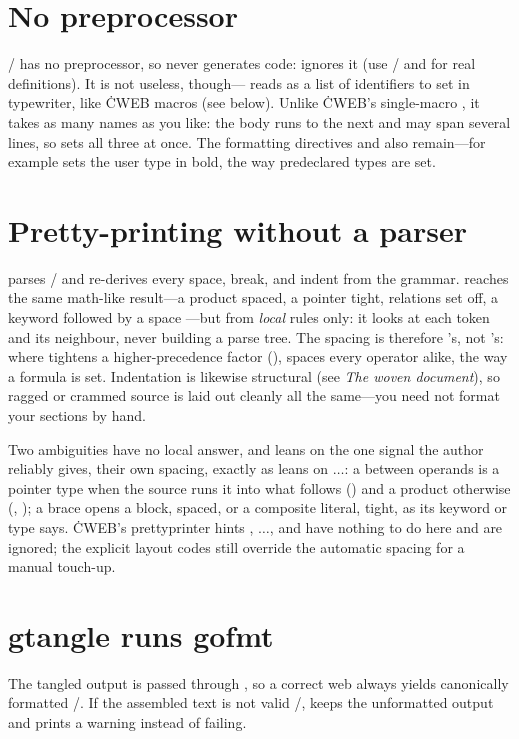 \section{No preprocessor}
\GO/ has no preprocessor, so  never generates code:  ignores it
(use \GO/  and  for real definitions). It is not useless,
though--- reads  as a list of identifiers to set in
typewriter, like \.{CWEB} macros (see below). Unlike \.{CWEB}'s single-macro
, it takes as many names as you like: the body runs to the next  and
may span several lines, so  sets all three at once. The
formatting directives  and  also remain---for example
 sets the user type  in bold, the way predeclared
types are set.

\section{Pretty-printing without a parser}
 parses \CEE/ and re-derives every space, break, and indent from the
grammar.  reaches the same math-like result---a product 
spaced, a pointer  tight, relations set off, a keyword followed by a space
---but from {\it local\/} rules only: it looks at each token and its neighbour,
never building a parse tree. The spacing is therefore 's, not
's: where  tightens a higher-precedence factor (),
 spaces every operator alike, the way a formula is set. Indentation is
likewise structural (see {\it The woven document\/}), so ragged or crammed source
is laid out cleanly all the same---you need not format your sections by hand.

Two ambiguities have no local answer, and  leans on the one signal the
author reliably gives, their own spacing, exactly as  leans on
\cw{@[}\thinspace$\ldots$\thinspace\cw{@]}: a \cw{*} between operands is a pointer
type when the source runs it into what follows () and a product otherwise
(, ); a brace opens a block, spaced, or a composite literal,
tight, as its keyword or type says. \.{CWEB}'s prettyprinter hints ,
\cw{@[}\thinspace$\ldots$\thinspace\cw{@]}, and  have nothing to do here and
are ignored; the explicit layout codes     still
override the automatic spacing for a manual touch-up.

\section{gtangle runs gofmt}
The tangled output is passed through , so a correct web always yields
canonically formatted \GO/. If the assembled text is not valid \GO/, 
keeps the unformatted output and prints a warning instead of failing.

